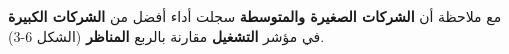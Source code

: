 مع ملاحظة أن \textbf{الشركات الصغيرة والمتوسطة} سجلت أداء أفضل من \textbf{الشركات الكبيرة} في مؤشر \textbf{التشغيل} مقارنة بالربع \textbf{المناظر} (الشكل 6-3).
